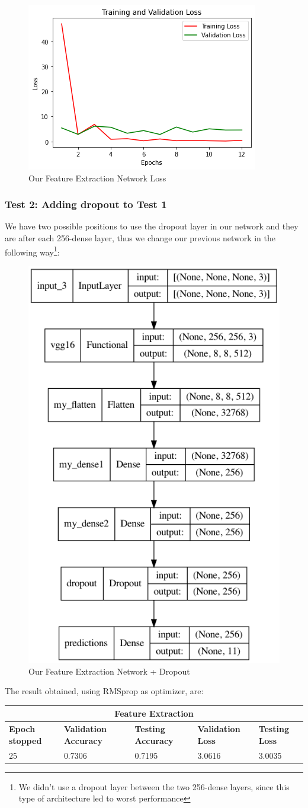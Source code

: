 \begin{figure}[H]
	\centering
	\includegraphics[height=0.45\textwidth]{img/vgg16fe1loss.png}
	\caption{Our Feature Extraction Network Loss}
	\label{fig:vgg16fe1loss}
\end{figure}

\subsubsection{Test 2: Adding dropout to Test 1}
We have two possible positions to use the dropout layer in our network and they are after each 256-dense layer, thus we change our previous network in the following way\footnote{We didn't use a dropout layer between the two 256-dense layers, since this type of architecture led to worst performance}:
\begin{figure}[H]
	\centering
	\includegraphics[height=0.45\textwidth]{img/vgg16fe2.png}
	\caption{Our Feature Extraction Network + Dropout}
	\label{fig:vgg16fe2}
\end{figure}
  

\noindent The result obtained, using RMSprop as optimizer, are:

\medskip

\begin{tabular}{ |p{2cm}|p{2cm}|p{2cm}|p{2cm}|p{2cm}|  }
\hline
\multicolumn{5}{|c|}{Feature Extraction} \\
\hline
\textbf{Epoch stopped} & \textbf{Validation Accuracy} & \textbf{Testing Accuracy} & \textbf{Validation Loss} & \textbf{Testing Loss} \\
\hline
25 & 0.7306 & 0.7195 & 3.0616 & 3.0035\\
\hline
\end{tabular}

